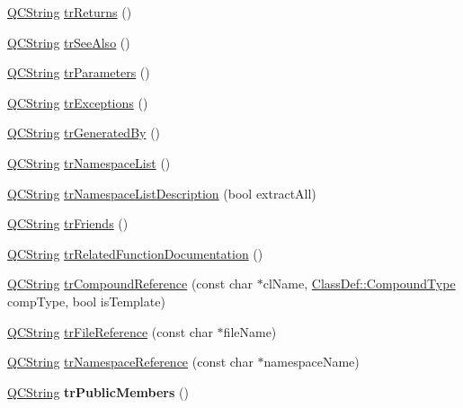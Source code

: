 \begin{DoxyCompactItemize}
\item 
\hyperlink{class_q_c_string}{Q\-C\-String} \hyperlink{class_translator_polish_a866a7410912e8a146c122548bcc313d5}{tr\-Returns} ()
\item 
\hyperlink{class_q_c_string}{Q\-C\-String} \hyperlink{class_translator_polish_ae2a38af2f296dd4c81df824a17ac5024}{tr\-See\-Also} ()
\item 
\hyperlink{class_q_c_string}{Q\-C\-String} \hyperlink{class_translator_polish_aed4586c549471023ca731d18612fe1d6}{tr\-Parameters} ()
\item 
\hyperlink{class_q_c_string}{Q\-C\-String} \hyperlink{class_translator_polish_afd184af42e35d6ef611899532f80935c}{tr\-Exceptions} ()
\item 
\hyperlink{class_q_c_string}{Q\-C\-String} \hyperlink{class_translator_polish_a131935c84cc3cc61a5b62f41619cb163}{tr\-Generated\-By} ()
\item 
\hyperlink{class_q_c_string}{Q\-C\-String} \hyperlink{class_translator_polish_a39eed55e25c2d4229943f15d313d3f1f}{tr\-Namespace\-List} ()
\item 
\hyperlink{class_q_c_string}{Q\-C\-String} \hyperlink{class_translator_polish_a4deddc96cf84bd66a4ffb8174a5d052b}{tr\-Namespace\-List\-Description} (bool extract\-All)
\item 
\hyperlink{class_q_c_string}{Q\-C\-String} \hyperlink{class_translator_polish_a09300dedef1bc1ce5c2de5d70e6051bf}{tr\-Friends} ()
\item 
\hyperlink{class_q_c_string}{Q\-C\-String} \hyperlink{class_translator_polish_ae97d87449f2ff86c736e70fdeb6c2534}{tr\-Related\-Function\-Documentation} ()
\item 
\hyperlink{class_q_c_string}{Q\-C\-String} \hyperlink{class_translator_polish_ad81a0f65ba81e71d53ed3362a7d2b074}{tr\-Compound\-Reference} (const char $\ast$cl\-Name, \hyperlink{class_class_def_a768a6f0a6fd7e9087ff7971abbcc3f36}{Class\-Def\-::\-Compound\-Type} comp\-Type, bool is\-Template)
\item 
\hyperlink{class_q_c_string}{Q\-C\-String} \hyperlink{class_translator_polish_ab665cdc5cebda16bb4acbdc62718a2ba}{tr\-File\-Reference} (const char $\ast$file\-Name)
\item 
\hyperlink{class_q_c_string}{Q\-C\-String} \hyperlink{class_translator_polish_a8afd00694e0e220867c090eecfdd861a}{tr\-Namespace\-Reference} (const char $\ast$namespace\-Name)
\item 
\hypertarget{class_translator_polish_a21c92afb604c94e0636482e72081e182}{\hyperlink{class_q_c_string}{Q\-C\-String} {\bfseries tr\-Public\-Members} ()}\label{class_translator_polish_a21c92afb604c94e0636482e72081e182}


\end{DoxyCompactItemize}
